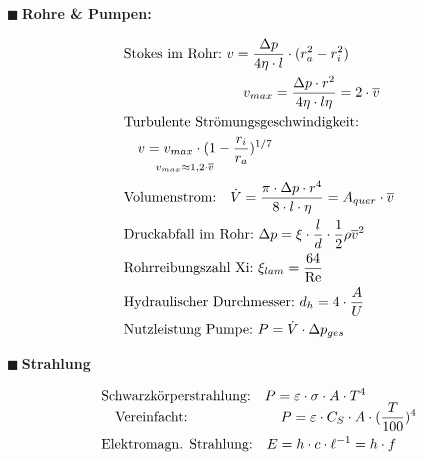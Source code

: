 \documentclass[a4paper,10pt]{article}
\renewcommand{\textbf}[1]{\textsf{{\bfseries {#1}}}}
\renewcommand{\plmtsquare}{{\color{miugray} $\blacksquare~$}}
\begin{document}
\begin{minipage}[t]{.35\textwidth}
\vspace*{8mm}
\plmtsquare \textbf{Rohre \& Pumpen:}\par \vspace*{-4mm}
\begin{align*}
&\text{Stokes im Rohr:} ~ v = \frac{\Delta p}{4\eta \cdot l} \cdot (r_a^2-r_i^2) \\ 
& \hspace*{3cm} v_{max} = \frac{\Delta p \cdot r^2}{4\eta \cdot l \eta} = 2 \cdot \overline{v} \\
&\text{Turbulente Strömungsgeschwindigkeit:}\\ & \quad v = v_{max} \cdot (1-\frac{r_i}{r_a})^{1/7}\\[-8pt]
&\hspace*{0.8cm} \scriptstyle{v_{max} \approx 1,2 \cdot \overline{v}}\\
&\text{Volumenstrom:} \quad \dot{V} = \frac{\pi \cdot \Delta p \cdot r^4}{8 \cdot l \cdot \eta} = A_{quer} \cdot \overline{v} \\ 
& \text{Druckabfall im Rohr:} ~ \Delta p = \xi \cdot \frac{l}{d} \cdot \frac{1}{2}\rho\overline{v}^2\\
&\text{Rohrreibungszahl Xi:} ~ \xi_{lam} = \frac{64}{\text{Re}}\\
&\text{Hydraulischer Durchmesser:} ~ d_h = 4\cdot \frac{A}{U}\\
&\text{Nutzleistung Pumpe:} ~ P = \dot{V} \cdot \Delta p_{ges}  \\
\end{align*}




\vspace*{8mm}
\plmtsquare \textbf{Strahlung} \par \vspace*{-4mm}
\begin{align*}
&\text{Schwarzkörperstrahlung:} \quad P = \varepsilon \cdot \sigma \cdot A \cdot T^4 \\[-6pt]
&\quad \text{Vereinfacht:} \hspace*{2cm} \quad P = \varepsilon \cdot C_S \cdot A \cdot (\frac{T}{100})^4 \\
&\text{Elektromagn. Strahlung:} \quad E = h \cdot c \cdot \ell^{-1} = h \cdot f \\
\end{align*}
\end{minipage}%
\vfill
	
	
\pagebreak
\raggedbottom
\end{document}
